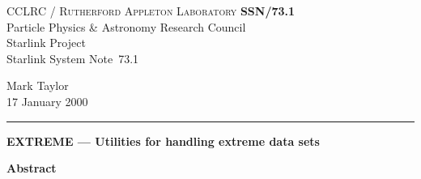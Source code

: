 \documentclass[twoside,11pt]{article}
\newcommand{\stardoccategory}  {Starlink System Note}
\newcommand{\stardocinitials}  {SSN}
\newcommand{\stardocnumber}    {73.1}
\newcommand{\stardocauthors}   {Mark Taylor}
\newcommand{\stardocdate}      {17 January 2000}
\newcommand{\stardoctitle}     {EXTREME --- 
                                Utilities for handling extreme data sets}
\newcommand{\stardocname}{\stardocinitials /\stardocnumber}
\newenvironment{latexonly}{}{}
\renewcommand{\_}{\texttt{\symbol{95}}}
\begin{document}
\thispagestyle{empty}

\begin{latexonly}
   CCLRC / \textsc{Rutherford Appleton Laboratory} \hfill \textbf{\stardocname}\\
   {\large Particle Physics \& Astronomy Research Council}\\
   {\large Starlink Project\\}
   {\large \stardoccategory\ \stardocnumber}
   \begin{flushright}
   \stardocauthors\\
   \stardocdate
   \end{flushright}
   \vspace{-4mm}
   \rule{\textwidth}{0.5mm}
   \vspace{5mm}
   \begin{center}
   {\Large\textbf{\stardoctitle}}
   \end{center}
   \vspace{5mm}

   \vspace{10mm}
   \begin{center}
      {\Large\textbf{Abstract}}
   \end{center}
\end{latexonly}
\end{document}

